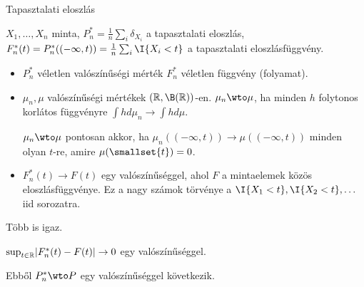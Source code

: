 \documentclass[aspectratio=169,notheorems,9pt,\option]{beamer}
\begin{document}
\begin{frame}{Tapasztalati eloszlás}
  \begin{df}
      $X_1,\dots, X_n$ minta, $P_n^*=\frac1n \sum_{i}\delta_{X_i}$ a
      tapasztalati eloszlás, $F_n^*(t)=P_n^*((-\infty,t))=\frac1n\sum_i\I{X_i<t}$ a tapasztalati eloszlásfüggvény. 
  \end{df}
  \begin{itemize}
      \item $P_n^*$ véletlen valószínűségi mérték $F_n^*$ véletlen függvény (folyamat).
      \item $\mu_n,\mu$ valószínűségi mértékek $(\real,\B(\real))$-en. 
      $\mu_n\wto \mu$, ha minden $h$ folytonos korlátos függvényre $\int h d\mu_n\to\int h d\mu$.

      $\mu_n\wto\mu$ pontosan akkor, ha $\mu_n((-\infty,t))\to \mu((-\infty,t))$ minden olyan $t$-re, amire $\mu(\smallset{t})=0$.

      \item $F_n^*(t)\to F(t)$ egy valószínűséggel, ahol $F$ a mintaelemek közös eloszlásfüggvénye. Ez a nagy számok törvénye a 
      $\I{X_1<t},\I{X_2<t},\dots$ iid sorozatra. 
  \end{itemize}
  \continue
  Több is igaz.
  \begin{theorem}
      $\sup_{t\in\mathbb{R}}\lvert F_n^*(t)-F(t)\rvert\to0$ egy valószínűséggel.
  \end{theorem}
  Ebből $P_n^*\wto P$ egy valószínűséggel következik.
\end{frame}
\end{document}

